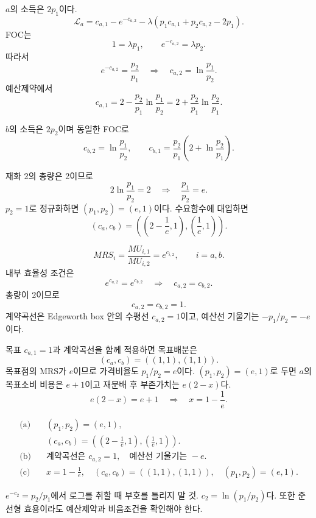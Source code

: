 \begin{solutionbox}
$a$의 소득은 $2p_1$이다.
\[
\mathcal L_a=c_{a,1}-e^{-c_{a,2}}
-\lambda(p_1c_{a,1}+p_2c_{a,2}-2p_1).
\]
FOC는
\[
1=\lambda p_1,\qquad e^{-c_{a,2}}=\lambda p_2.
\]
따라서
\[
e^{-c_{a,2}}=\frac{p_2}{p_1}
\quad\Longrightarrow\quad
c_{a,2}=\ln\frac{p_1}{p_2}.
\]
예산제약에서
\[
c_{a,1}=2-\frac{p_2}{p_1}\ln\frac{p_1}{p_2}
=2+\frac{p_2}{p_1}\ln\frac{p_2}{p_1}.
\]

$b$의 소득은 $2p_2$이며 동일한 FOC로
\[
c_{b,2}=\ln\frac{p_1}{p_2},
\qquad
c_{b,1}=\frac{p_2}{p_1}\left(2+\ln\frac{p_2}{p_1}\right).
\]

재화 2의 총량은 2이므로
\[
2\ln\frac{p_1}{p_2}=2
\quad\Longrightarrow\quad
\frac{p_1}{p_2}=e.
\]
$p_2=1$로 정규화하면 $(p_1,p_2)=(e,1)$이다. 수요함수에 대입하면
\[
(c_a,c_b)=\left(\left(2-\frac1e,1\right),\left(\frac1e,1\right)\right).
\]

\[
MRS_i=\frac{MU_{i,1}}{MU_{i,2}}=e^{c_{i,2}},\qquad i=a,b.
\]
내부 효율성 조건은
\[
e^{c_{a,2}}=e^{c_{b,2}}
\quad\Longrightarrow\quad c_{a,2}=c_{b,2}.
\]
총량이 2이므로
\[
\boxed{c_{a,2}=c_{b,2}=1}.
\]
계약곡선은 Edgeworth box 안의 수평선 $c_{a,2}=1$이고, 예산선 기울기는 $-p_1/p_2=-e$이다.

목표 $c_{a,1}=1$과 계약곡선을 함께 적용하면 목표배분은
\[
(c_a,c_b)=((1,1),(1,1)).
\]
목표점의 MRS가 $e$이므로 가격비율도 $p_1/p_2=e$이다. $(p_1,p_2)=(e,1)$로 두면 $a$의 목표소비 비용은 $e+1$이고 재분배 후 부존가치는 $e(2-x)$다.
\[
e(2-x)=e+1
\quad\Longrightarrow\quad
\boxed{x=1-\frac1e}.
\]
\end{solutionbox}

\begin{answerbox}
\begin{align*}
\text{(a)}\quad &(p_1,p_2)=(e,1),\\
&(c_a,c_b)=\left(\left(2-\frac1e,1\right),\left(\frac1e,1\right)\right).\\
\text{(b)}\quad &\text{계약곡선은 }c_{a,2}=1,\quad\text{예산선 기울기는 }-e.\\
\text{(c)}\quad &x=1-\frac1e,\quad (c_a,c_b)=((1,1),(1,1)),\quad(p_1,p_2)=(e,1).
\end{align*}
\end{answerbox}

\begin{warningbox}
$e^{-c_2}=p_2/p_1$에서 로그를 취할 때 부호를 틀리지 말 것. $c_2=\ln(p_1/p_2)$다. 또한 준선형 효용이라도 예산제약과 비음조건을 확인해야 한다.
\end{warningbox}

